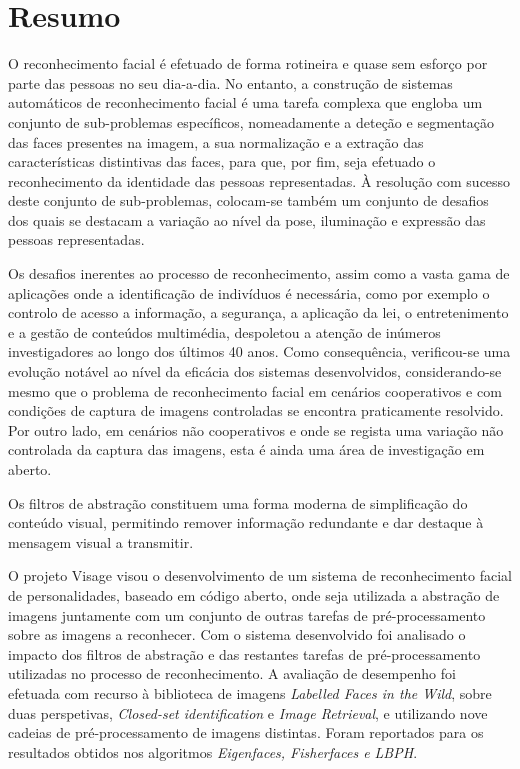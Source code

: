 \chapter*{Resumo}
O reconhecimento facial é efetuado de forma rotineira e quase sem esforço por parte das pessoas no seu dia-a-dia. No entanto, a construção de sistemas automáticos de reconhecimento facial é uma tarefa complexa que engloba um conjunto de sub-problemas específicos, nomeadamente a deteção e segmentação das faces presentes na imagem, a sua normalização e a extração das características distintivas das faces, para que, por fim, seja efetuado o reconhecimento da identidade das pessoas representadas. À resolução com sucesso deste conjunto de sub-problemas, colocam-se também um conjunto de desafios dos quais se destacam a variação ao nível da pose, iluminação e expressão das pessoas representadas.

Os desafios inerentes ao processo de reconhecimento, assim como a vasta gama de aplicações onde a identificação de indivíduos é necessária, como por exemplo o controlo de acesso a informação, a segurança, a aplicação da lei, o entretenimento e a gestão de conteúdos multimédia, despoletou a atenção de inúmeros investigadores ao longo dos últimos 40 anos. Como consequência, verificou-se uma evolução notável ao nível da eficácia dos sistemas desenvolvidos, considerando-se mesmo que o problema de reconhecimento facial em cenários cooperativos e com condições de captura de imagens controladas se encontra praticamente resolvido. Por outro lado, em cenários não cooperativos e onde se regista uma variação não controlada da captura das imagens, esta é ainda uma área de investigação em aberto. 

Os filtros de abstração constituem uma forma moderna de simplificação do conteúdo visual, permitindo remover informação redundante e dar destaque à mensagem visual a transmitir.

O projeto Visage visou o desenvolvimento de um sistema de reconhecimento facial de personalidades, baseado em código aberto, onde seja utilizada a abstração de imagens juntamente com um conjunto de outras tarefas de pré-processamento sobre as imagens a reconhecer. Com o sistema desenvolvido foi analisado o impacto dos filtros de abstração e das restantes tarefas de pré-processamento utilizadas no processo de reconhecimento. A avaliação de desempenho foi efetuada com recurso à biblioteca de imagens \textit{Labelled Faces in the Wild}, sobre duas perspetivas, \textit{Closed-set identification} e \textit{Image Retrieval}, e utilizando nove cadeias de pré-processamento de imagens distintas. Foram reportados para os resultados obtidos nos algoritmos \textit{Eigenfaces, Fisherfaces e LBPH}.

